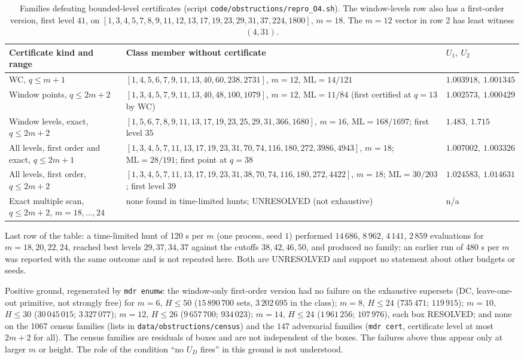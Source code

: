\documentclass[11pt]{article}
\theoremstyle{remark}
\newcommand{\ML}{\mathrm{ML}}
\begin{document}
\begin{table}[h]
\centering\scriptsize
\begin{tabular}{@{}p{2.4cm}p{9.0cm}p{1.9cm}@{}}
\toprule
Certificate kind and range & Class member without certificate & $U_1,\ U_2$\\
\midrule
WC, $q\le m+1$ & $[1,4,5,6,7,9,11,13,40,60,238,2731]$, $m=12$, $\ML=14/121$ & $1.003918,\ 1.001345$\\
Window points, $q\le2m+2$ & $[1,3,4,5,7,9,11,13,40,48,100,1079]$, $m=12$, $\ML=11/84$ (first certified at $q=13$ by WC) & $1.002573,\ 1.000429$\\
Window levels, exact, $q\le 2m+2$ & $[1,5,6,7,8,9,11,13,17,19,23,25,29,31,366,1680]$, $m=16$, $\ML=168/1697$; first level $35$ & $1.483,\ 1.715$\\
All levels, first order and exact, $q\le2m+1$ & $[1,3,4,5,7,11,13,17,19,23,31,70,74,116,180,272,3986,4943]$, $m=18$; $\ML=28/191$; first point at $q=38$ & $1.007002,\ 1.003326$\\
All levels, first order, $q\le2m+2$ & $[1,3,4,5,7,11,13,17,19,23,31,38,70,74,116,180,272,4422]$, $m=18$; $\ML=30/203$; first level $39$ & $1.024583,\ 1.014631$\\
Exact multiple scan, $q\le 2m+2$, $m=18,\dots,24$ & none found in time-limited hunts; UNRESOLVED (not exhaustive) & n/a\\
\bottomrule
\end{tabular}
\caption{Families defeating bounded-level certificates (script \texttt{code/obstructions/repro\_O4.sh}). The window-levels row also has a first-order version, first level $41$, on $[1,3,4,5,7,8,9,11,12,13,17,19,23,29,31,37,224,1800]$, $m=18$. The $m=12$ vector in row 2 has least witness $(4,31)$.}\label{tab:O4}
\end{table}

Last row of the table: a time-limited hunt of 120 s per $m$ (one process, seed $1$) performed $14\,686$, $8\,962$, $4\,141$, $2\,859$ evaluations for $m=18,20,22,24$, reached best levels $29,37,34,37$ against the cutoffs $38,42,46,50$, and produced no family; an earlier run of 480 s per $m$ was reported with the same outcome and is not repeated here. Both are UNRESOLVED and support no statement about other budgets or seeds.

Positive ground, regenerated by \texttt{mdr enumw}: the window-only first-order version had no failure on the exhaustive supersets (DC, leave-one-out primitive, not strongly free) for $m=6$, $H\le50$ ($15\,890\,700$ sets, $3\,202\,695$ in the class); $m=8$, $H\le24$ ($735\,471$; $119\,915$); $m=10$, $H\le30$ ($30\,045\,015$; $3\,327\,077$); $m=12$, $H\le26$ ($9\,657\,700$; $934\,023$); $m=14$, $H\le24$ ($1\,961\,256$; $107\,976$), each box RESOLVED; and none on the 1067 census families (lists in \texttt{data/obstructions/census}) and the $147$ adversarial families (\texttt{mdr cert}, certificate level at most $2m+2$ for all). The census families are residuals of boxes and are not independent of the boxes. The failures above thus appear only at larger $m$ or height. The role of the condition ``no $U_D$ fires'' in this ground is not understood.
\end{document}
